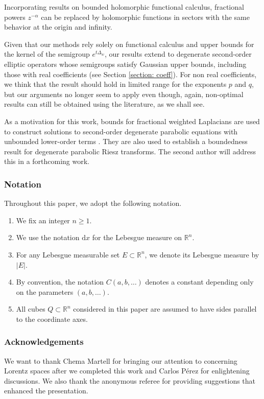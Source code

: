 \documentclass[12pt, letterpaper]{amsart}
\theoremstyle{definition}
\theoremstyle{remark}
\numberwithin{equation}{section}
\begin{document}
Incorporating results on bounded holomorphic functional calculus, fractional powers $z^{-\alpha}$ can be replaced by holomorphic functions in sectors with the same behavior at the origin and infinity. 


Given that our methods rely solely on functional calculus and upper bounds for the kernel of the semigroup $e^{t\Delta_w}$, our results extend to degenerate second-order elliptic operators whose semigroups satisfy Gaussian upper bounds, including those with real coefficients (see Section \ref{section: coeff}). For non real coefficients, we think that the result should hold in limited range for the exponents $p$ and $q$, but our arguments no longer seem to apply even though, again, non-optimal results can still be obtained using the literature, as we shall see.



As a motivation for this work, bounds for fractional weighted Laplacians are used to construct solutions to second-order degenerate parabolic equations with unbounded lower-order terms \cite{baadi2026wellposedness}. They are also used to establish a boundedness result for degenerate parabolic Riesz transforms. The second author will address this in a forthcoming work.



\subsubsection*{\textbf{Notation}} Throughout this paper, we adopt the following notation.
\begin{enumerate}[label=$\blacklozenge$]
\item We fix an integer $n \ge 1$. 
\item We use the notation $\mathrm{d}x$ for the Lebesgue measure on $\mathbb{R}^n$.
\item For any Lebesgue measurable set $E \subset \mathbb{R}^n$, we denote its Lebesgue measure by $|E|$.
\item By convention, the notation $C(a,b,\ldots)$ denotes a constant depending only on the parameters $(a,b,\ldots)$.
\item All cubes $Q \subset \mathbb{R}^n$ considered in this paper are assumed to have sides parallel to the coordinate axes.
\end{enumerate}

\subsubsection*{\textbf{Acknowledgements}}
We want to thank Chema Martell for bringing our attention to \cite{MR4440073} concerning Lorentz spaces after we completed this work and Carlos Pérez for enlightening discussions. We also thank the anonymous referee for providing suggestions that enhanced the presentation.
\end{document}
